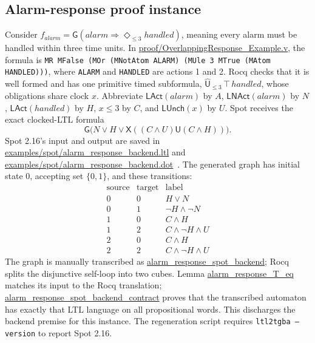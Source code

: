 \documentclass{ieeeaccess}
\newcommand{\Until}{\mathbin{\mathsf{U}}}
\newcommand{\Next}{\mathsf{X}}
\newcommand{\Rocqid}[1]{\url{#1}}
\begin{document}
\subsection{Alarm-response proof instance}
\label{sec:alarm-example}
Consider $f_{\mathit{alarm}}=\mathsf{G}(\mathit{alarm}\Rightarrow
\Diamond_{\le 3}\mathit{handled})$, meaning every alarm must be handled within
three time units. In
\Rocqid{proof/OverlappingResponse_Example.v}, the formula is
\texttt{MR MFalse (MOr (MNotAtom ALARM) (MUle 3 MTrue (MAtom HANDLED)))},
where \texttt{ALARM} and \texttt{HANDLED} are actions 1 and 2. Rocq checks
that it is well formed and has one primitive timed subformula,
$\widehat{\mathsf{U}}_{\le 3}\,\top\,\mathit{handled}$, whose obligations
share clock $x$. Abbreviate $\mathsf{LAct}(\mathit{alarm})$ by $A$,
$\mathsf{LNAct}(\mathit{alarm})$ by $N$,
$\mathsf{LAct}(\mathit{handled})$ by $H$, $x\le3$ by $C$, and
$\mathsf{LUnch}(x)$ by $U$. Spot receives the exact clocked-LTL formula
\[
\mathsf{G}\bigl(N\lor H\lor \Next((C\land U)\Until(C\land H))\bigr).
\]
Spot 2.16's input and output are saved in
\Rocqid{examples/spot/alarm_response_backend.ltl} and
\Rocqid{examples/spot/alarm_response_backend.dot}~\cite{[spot]}. The generated graph has
initial state 0, accepting set $\{0,1\}$, and these transitions:
\[
\begin{array}{c|c|l}
\text{source}&\text{target}&\text{label}\\ \hline
0&0&H\lor N\\
0&1&\neg H\land\neg N\\
1&0&C\land H\\
1&2&C\land\neg H\land U\\
2&0&C\land H\\
2&2&C\land\neg H\land U
\end{array}
\]
The graph is manually transcribed as
\Rocqid{alarm_response_spot_backend}; Rocq splits the disjunctive
self-loop into two cubes. Lemma
\Rocqid{alarm_response_T_eq} matches its input to the Rocq translation;
\Rocqid{alarm_response_spot_backend_contract} proves that the transcribed
automaton has exactly that LTL language on all propositional words. This
discharges the backend premise for this instance. The regeneration script
requires \texttt{ltl2tgba --version} to report Spot 2.16.
\end{document}
